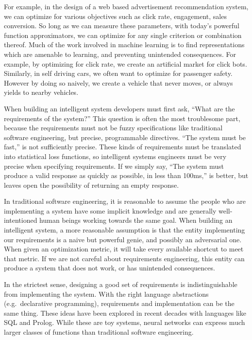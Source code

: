 \documentclass[12pt,initial,twoside,maitrise]{dms}
\numberwithin{equation}{section}
\numberwithin{table}{chapter}
\numberwithin{figure}{chapter}
\begin{document}
For example, in the design of a web based advertisement recommendation system, we can optimize for various objectives such as click rate, engagement, sales conversion. So long as we can measure these parameters, with today's powerful function approximators, we can optimize for any single criterion or combination thereof. Much of the work involved in machine learning is to find representations which are amenable to learning, and preventing unintended consequences. For example, by optimizing for click rate, we create an artificial market for click bots. Similarly, in self driving cars, we often want to optimize for passenger safety. However by doing so naively, we create a vehicle that never moves, or always yields to nearby vehicles.

When building an intelligent system developers must first ask, ``What are the requirements of the system?'' This question is often the most troublesome part, because the requirements must not be fuzzy specifications like traditional software engineering, but precise, programmable directives. ``The system must be fast,'' is not sufficiently precise. These kinds of requirements must be translated into statistical loss functions, so intelligent systems engineers must be very precise when specifying requirements. If we simply say, ``The system must produce a valid response as quickly as possible, in less than 100ms,'' is better, but leaves open the possibility of returning an empty response.

In traditional software engineering, it is reasonable to assume the people who are implementing a system have some implicit knowledge and are generally well-intentioned human beings working towards the same goal. When building an intelligent system, a more reasonable assumption is that the entity implementing our requirements is a naive but powerful genie, and possibly an adversarial one. When given an optimization metric, it will take every available shortcut to meet that metric. If we are not careful about requirements engineering, this entity can produce a system that does not work, or has unintended consequences.

In the strictest sense, designing a good set of requirements is indistinguishable from implementing the system. With the right language abstractions (e.g.\ declarative programming), requirements and implementation can be the same thing. These ideas have been explored in recent decades with languages like SQL and Prolog. While these are toy systems, neural networks can express much larger classes of functions than traditional software engineering.
\end{document}
